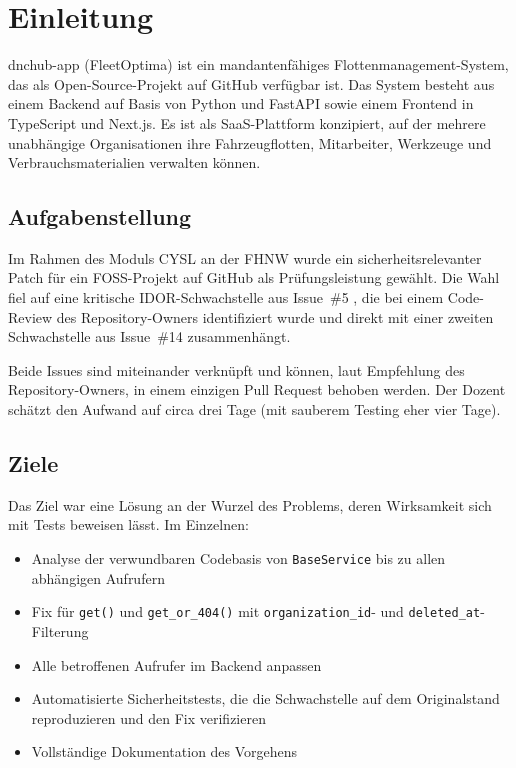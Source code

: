 \section{Einleitung}
\label{sec:einleitung}

dnchub-app (FleetOptima) ist ein mandantenfähiges Flottenmanagement-System,
das als Open-Source-Projekt auf GitHub verfügbar ist. Das System besteht
aus einem Backend auf Basis von Python und FastAPI
\parencite{fastapi_docs} sowie einem Frontend in TypeScript und Next.js.
Es ist als SaaS-Plattform konzipiert, auf der mehrere unabhängige
Organisationen ihre Fahrzeugflotten, Mitarbeiter, Werkzeuge und
Verbrauchsmaterialien verwalten können.

\subsection{Aufgabenstellung}

Im Rahmen des Moduls CYSL an der FHNW wurde ein
sicherheitsrelevanter Patch für ein FOSS-Projekt auf GitHub als
Prüfungsleistung gewählt. Die Wahl fiel auf eine kritische
IDOR-Schwachstelle aus Issue~\#5 \parencite{github_issue_5}, die bei einem
Code-Review des Repository-Owners identifiziert wurde und direkt mit
einer zweiten Schwachstelle aus Issue~\#14 \parencite{github_issue_14}
zusammenhängt.

Beide Issues sind miteinander verknüpft und können, laut Empfehlung des
Repository-Owners, in einem einzigen Pull Request behoben werden. Der Dozent
schätzt den Aufwand auf circa drei Tage (mit sauberem Testing eher vier Tage).

\subsection{Ziele}

Das Ziel war eine Lösung an der Wurzel des Problems, deren Wirksamkeit
sich mit Tests beweisen lässt. Im Einzelnen:

\begin{itemize}
      \item Analyse der verwundbaren Codebasis von \texttt{BaseService}
            bis zu allen abhängigen Aufrufern
      \item Fix für \texttt{get()} und
            \texttt{get\_or\_404()} mit \texttt{organization\_id}-
            und \texttt{deleted\_at}-Filterung
      \item Alle betroffenen Aufrufer im Backend anpassen
      \item Automatisierte Sicherheitstests, die die Schwachstelle auf
            dem Originalstand reproduzieren und den Fix verifizieren
      \item Vollständige Dokumentation des Vorgehens
\end{itemize}

